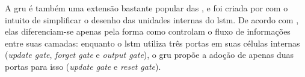 

A \acrshort{gru} é também uma extensão bastante popular das , e foi criada por  com o intuito de simplificar o desenho das unidades internas do \acrshort{lstm}. 
De acordo com , elas diferenciam-se apenas pela forma como controlam o fluxo de informações entre suas camadas: enquanto o \acrshort{lstm} utiliza três portas em suas células internas (\textit{update gate}, \textit{forget gate} e \textit{output gate}), o \acrshort{gru} propõe a adoção de apenas duas portas para isso (\textit{update gate} e \textit{reset gate}).




